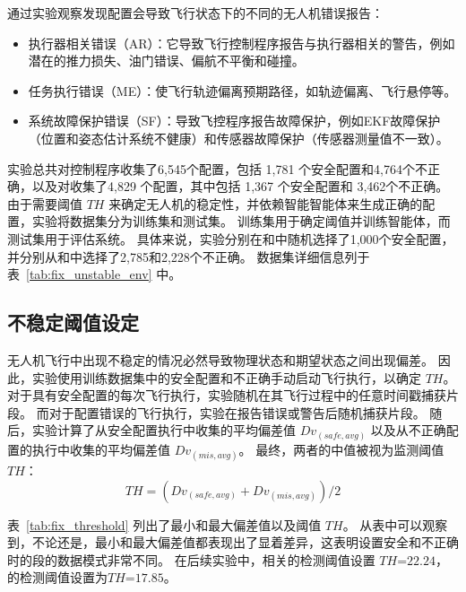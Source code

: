 通过实验观察发现配置会导致飞行状态下的不同的无人机错误报告：
\begin{itemize}
\item 执行器相关错误（AR）：它导致飞行控制程序报告与执行器相关的警告，例如潜在的推力损失、油门错误、偏航不平衡和碰撞。

\item 任务执行错误（ME）：使飞行轨迹偏离预期路径，如轨迹偏离、飞行悬停等。

\item 系统故障保护错误（SF）：导致飞控程序报告故障保护，例如EKF故障保护（位置和姿态估计系统不健康）和传感器故障保护（传感器测量值不一致）。

\end{itemize}

实验总共对控制程序收集了6,545个配置，包括 1,781 个安全配置和4,764个不正确，以及对收集了4,829 个配置，其中包括 1,367 个安全配置和 3,462个不正确。
由于\nyctea 需要阈值 $TH$ 来确定无人机的稳定性，并依赖智能智能体来生成正确的配置，实验将数据集分为训练集和测试集。
训练集用于确定阈值并训练智能体，而测试集用于评估系统。
具体来说，实验分别在和中随机选择了1,000个安全配置，并分别从和中选择了2,785和2,228个不正确。
数据集详细信息列于表~\ref{tab:fix_unstable_env} 中。



\subsection{不稳定阈值设定}\label{subsec:fix_th_decided}
无人机飞行中出现不稳定的情况必然导致物理状态和期望状态之间出现偏差。
因此，实验使用训练数据集中的安全配置和不正确手动启动飞行执行，以确定 $TH$。
对于具有安全配置的每次飞行执行，实验随机在其飞行过程中的任意时间戳捕获片段。
而对于配置错误的飞行执行，实验在报告错误或警告后随机捕获片段。
随后，实验计算了从安全配置执行中收集的平均偏差值 $Dv_{(safe,avg)}$ 以及从不正确配置的执行中收集的平均偏差值 $Dv_{(mis, avg)}$。
最终，两者的中值被视为监测阈值 $TH$：
\begin{equation}
    TH = (Dv_{(safe,avg)} + Dv_{(mis,avg)})/2
\end{equation}

表~\ref{tab:fix_threshold} 列出了最小和最大偏差值以及阈值 $TH$。
从表中可以观察到，不论还是，最小和最大偏差值都表现出了显着差异，这表明设置安全和不正确时的段的数据模式非常不同。
在后续实验中，相关的检测阈值设置 $TH$=$22.24$，的检测阈值设置为$TH$=$17.85$。

